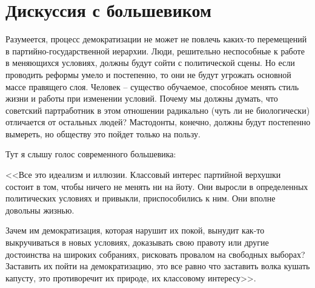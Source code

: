 \documentclass{book}
\begin{document}
\section{Дискуссия с большевиком}

Разумеется, процесс демократизации не может не повлечь каких-то перемещений в пар\-тий\-но-го\-су\-дар\-ствен\-ной иерархии. Люди, решительно неспособные к работе в меняющихся условиях, должны будут сойти с политической сцены. Но если проводить реформы умело и постепенно, то они не будут угрожать основной массе правящего слоя. Человек -- существо обучаемое, способное менять стиль жизни и работы при изменении условий. Почему мы должны думать, что советский партработник в этом отношении радикально (чуть ли не биологически) отличается от остальных людей? Мастодонты, конечно, должны будут постепенно вымереть, но обществу это пойдет только на пользу.

Тут я слышу голос современного большевика:

<<Все это идеализм и иллюзии. Классовый интерес партийной верхушки состоит в том, чтобы ничего не менять ни на йоту. Они выросли в определенных политических условиях и привыкли, приспособились к ним. Они вполне довольны жизнью.

Зачем им демократизация, которая нарушит их покой, выну­дит как-то выкручиваться в новых условиях, доказывать свою правоту или другие достоинства на широких собраниях, риско­вать провалом на свободных выборах? Заставить их пойти на демократизацию, это все равно что заставить волка кушать капусту, это противоречит их природе, их классовому интересу>>.
\end{document}
